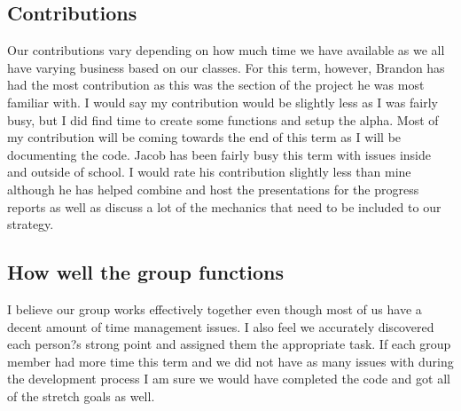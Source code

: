 \documentclass[10pt,letterpaper,onecolumn,draftclsnofoot]{IEEEtran}
\begin{document}
\subsection{Contributions}
Our contributions vary depending on how much time we have available as we all have varying business based on our classes. For this term, however, Brandon has had the most contribution as this was the section of the project he was most familiar with. I would say my contribution would be slightly less as I was fairly busy, but I did find time to create some functions and setup the alpha. Most of my contribution will be coming towards the end of this term as I will be documenting the code. Jacob has been fairly busy this term with issues inside and outside of school. I would rate his contribution slightly less than mine although he has helped combine and host the presentations for the progress reports as well as discuss a lot of the mechanics that need to be included to our strategy.

\subsection{How well the group functions}
I believe our group works effectively together even though most of us have a decent amount of time management issues. I also feel we accurately discovered each person?s strong point and assigned them the appropriate task. If each group member had more time this term and we did not have as many issues with during the development process I am sure we would have completed the code and got all of the stretch goals as well.
\end{document}
